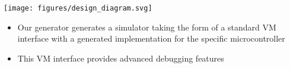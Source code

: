 \begin{block}{\large {}\vphantom{Design}}
\begin{center}
	\texttt{[image: figures/design\_diagram.svg]}\\
\end{center}
\begin{itemize}
\item{Our generator generates a simulator taking the form of a standard VM interface
with a generated implementation for the specific microcontroller}
\item{This VM interface provides advanced debugging features}
\end{itemize}
\end{block}

